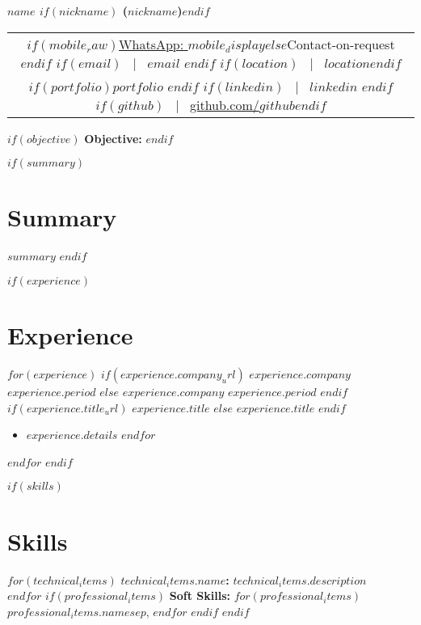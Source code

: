 \documentclass[10.5pt,a4paper]{article}
\newcommand{\daterange}[1]{\textbf{#1}}
\newcommand{\entryHeader}[2]{\noindent\textbf{#1} \hfill \daterange{#2}}
\newcommand{\entryHeaderLinked}[3]{\noindent\textbf{\href{#1}{#2}} \hfill \daterange{#3}}
\newcommand{\entrySubHeader}[1]{\textit{#1}}
\newcommand{\entrySubHeaderLinked}[2]{\textit{\href{#1}{#2}}}
\newenvironment{entryDetails}{%
  \begin{itemize}[leftmargin=*, itemsep=1pt, topsep=1pt, parsep=0pt]
}{%
  \end{itemize}
  \vspace{-0.1cm}
}
\begin{document}
\begin{center}
    {\LARGE \textbf{$name$ $if(nickname)$ ($nickname$)$endif$}}\\
    \begin{tabular}{@{}c@{}}
        $if(mobile_raw)$\href{https://wa.me/$country_code$$mobile_raw$}{WhatsApp: $mobile_display$}$else$Contact-on-request$endif$
        $if(email)$ ~|~ \href{mailto:$email$}{$email$} $endif$
        $if(location)$ ~|~ $location$$endif$                                                                      \\
        $if(portfolio)$\href{https://$portfolio$?utm_source=resume & utm_medium=document}{$portfolio$} $endif$
        $if(linkedin)$ ~|~ \href{https://$linkedin$}{$linkedin$} $endif$
        $if(github)$ ~|~ \href{https://github.com/$github$}{github.com/$github$}$endif$
    \end{tabular}
\end{center}

$if(objective)$
{\large\bfseries\color{sectioncolor}Objective:} 
\vspace{5pt}
$endif$

$if(summary)$
\section*{Summary}
$summary$
$endif$

$if(experience)$
\section*{Experience}
$for(experience)$
$if(experience.company_url)$
\entryHeaderLinked{$experience.company_url$}{$experience.company$}{$experience.period$}
$else$
\entryHeader{$experience.company$}{$experience.period$}
$endif$
\\
$if(experience.title_url)$
\entrySubHeaderLinked{$experience.title_url$}{$experience.title$}
$else$
\entrySubHeader{$experience.title$}
$endif$
\begin{entryDetails}
	$for(experience.details)$
	\item $experience.details$
	$endfor$
\end{entryDetails}
$endfor$
$endif$

$if(skills)$
\section*{Skills}
$for(technical_items)$
\noindent\textbf{$technical_items.name$:} $technical_items.description$\\[2pt]
$endfor$
$if(professional_items)$
\noindent\textbf{Soft Skills:} $for(professional_items)$$professional_items.name$$sep$, $endfor$
$endif$
$endif$
\end{document}

